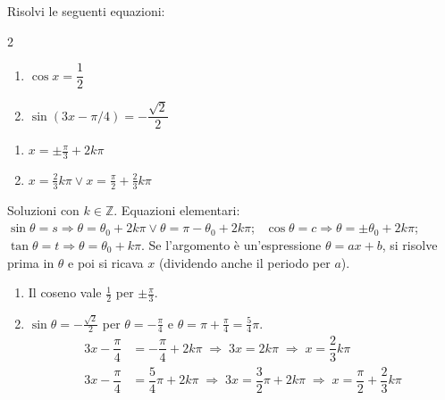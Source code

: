 \begin{question}[ID=4.3, subtitle={Equazioni goniometriche elementari}, tags={goniometria, equazioni goniometriche}, difficulty=facile]
Risolvi le seguenti equazioni:
\begin{multicols}{2}
\begin{enumerate}
\item $\cos x = \dfrac{1}{2}$
\item $\sin(3x - \pi/4) = -\dfrac{\sqrt{2}}{2}$
\end{enumerate}
\end{multicols}
\begin{solution}
\begin{enumerate}
    \item $x=\pm\tfrac\pi3+2k\pi$
    \item $x=\tfrac23k\pi \vee x=\tfrac\pi2+\tfrac23k\pi$
\end{enumerate}
\end{solution}
\begin{explanation}
Soluzioni con $k\in\mathbb{Z}$. Equazioni elementari: \ $\sin\theta=s \Rightarrow \theta=\theta_0+2k\pi \vee \theta=\pi-\theta_0+2k\pi$; \ $\cos\theta=c \Rightarrow \theta=\pm\theta_0+2k\pi$; \ $\tan\theta=t \Rightarrow \theta=\theta_0+k\pi$. Se l'argomento è un'espressione $\theta=ax+b$, si risolve prima in $\theta$ e poi si ricava $x$ (dividendo anche il periodo per $a$).
\begin{enumerate}
    \item Il coseno vale $\tfrac12$ per $\pm\tfrac\pi3$.
    \item $\sin\theta=-\tfrac{\sqrt2}{2}$ per $\theta=-\tfrac\pi4$ e $\theta=\pi+\tfrac\pi4=\tfrac54\pi$.
    \[\begin{aligned}
    3x-\dfrac\pi4 &= -\dfrac\pi4+2k\pi \;\Rightarrow\; 3x=2k\pi \;\Rightarrow\; x=\dfrac23k\pi\\
    3x-\dfrac\pi4 &= \dfrac54\pi+2k\pi \;\Rightarrow\; 3x=\dfrac32\pi+2k\pi \;\Rightarrow\; x=\dfrac\pi2+\dfrac23k\pi
    \end{aligned}\]
\end{enumerate}
\end{explanation}
\end{question}


